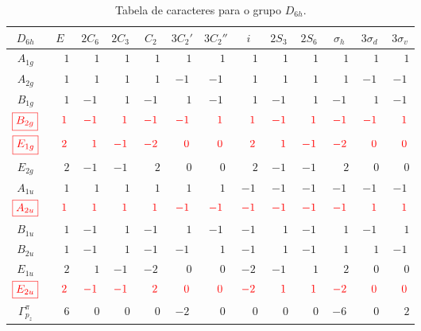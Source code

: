 \documentclass[a4paper,10pt]{article}
\renewcommand{\p}{\phantom{+}}
\renewcommand{\c}[1]{\textcolor{red}{#1}}
\begin{document}
\begin{table}[H]
\caption{Tabela de caracteres para o grupo $D_{6h}$.}
\centering

\begin{tabular} { |c|c c c c c c c c c c c c | }
\hline
$D_{6h}$ & $E$ & $2 C_6$ & $2 C_3$ & $C_2$ & $3 C_2'$ & $3 C_2''$ & $i$ & $2 S_3$ & $2 S_6$ & $\sigma_h$ & $3 \sigma_d$ & $3 \sigma_v$ \\
\hline
$A_{1g}$ & $\p1$ & $\p1$ & $\p1$ & $\p1$ & $\p1$ & $\p1$ & $\p1$ & $\p1$ & $\p1$ & $\p1$ & $\p1$ & $\p1$ \\
$A_{2g}$ & $\p1$ & $\p1$ & $\p1$ & $\p1$ & $ -1$ & $ -1$ & $\p1$ & $\p1$ & $\p1$ & $\p1$ & $ -1$ & $ -1$ \\
$B_{1g}$ & $\p1$ & $ -1$ & $\p1$ & $ -1$ & $\p1$ & $ -1$ & $\p1$ & $ -1$ & $\p1$ & $ -1$ & $\p1$ & $ -1$ \\
$\c{\boxed{B_{2g}}}$ & $\c{\p1}$ & $\c{ -1}$ & $\c{\p1}$ & $\c{ -1}$ & $\c{ -1}$ & $\c{\p1}$ & $\c{\p1}$ & $\c{ -1}$ & $\c{\p1}$ & $\c{ -1}$ & $\c{ -1}$ & $\c{\p1}$ \\
$\c{\boxed{E_{1g}}}$ & $\c{\p2}$ & $\c{\p1}$ & $\c{ -1}$ & $\c{ -2}$ & $\c{\p0}$ & $\c{\p0}$ & $\c{\p2}$ & $\c{\p1}$ & $\c{ -1}$ & $\c{ -2}$ & $\c{\p0}$ & $\c{\p0}$ \\
$E_{2g}$ & $\p2$ & $ -1$ & $ -1$ & $\p2$ & $\p0$ & $\p0$ & $\p2$ & $ -1$ & $ -1$ & $\p2$ & $\p0$ & $\p0$ \\
$A_{1u}$ & $\p1$ & $\p1$ & $\p1$ & $\p1$ & $\p1$ & $\p1$ & $ -1$ & $ -1$ & $ -1$ & $ -1$ & $ -1$ & $ -1$ \\
$\c{\boxed{A_{2u}}}$ & $\c{\p1}$ & $\c{\p1}$ & $\c{\p1}$ & $\c{\p1}$ & $\c{ -1}$ & $\c{ -1}$ & $\c{ -1}$ & $\c{ -1}$ & $\c{ -1}$ & $\c{ -1}$ & $\c{\p1}$ & $\c{\p1}$ \\
$B_{1u}$ & $\p1$ & $ -1$ & $\p1$ & $ -1$ & $\p1$ & $ -1$ & $ -1$ & $\p1$ & $ -1$ & $\p1$ & $ -1$ & $\p1$ \\
$B_{2u}$ & $\p1$ & $ -1$ & $\p1$ & $ -1$ & $ -1$ & $\p1$ & $ -1$ & $\p1$ & $ -1$ & $\p1$ & $\p1$ & $ -1$ \\
$E_{1u}$ & $\p2$ & $\p1$ & $ -1$ & $ -2$ & $\p0$ & $\p0$ & $ -2$ & $ -1$ & $\p1$ & $\p2$ & $\p0$ & $\p0$ \\
$\c{\boxed{E_{2u}}}$ & $\c{\p2}$ & $\c{ -1}$ & $\c{ -1}$ & $\c{\p2}$ & $\c{\p0}$ & $\c{\p0}$ & $\c{ -2}$ & $\c{\p1}$ & $\c{\p1}$ & $\c{ -2}$ & $\c{\p0}$ & $\c{\p0}$ \\
\hline
\hline
$\Gamma_{p_z}^\pi$ & $\p6$ & $\p0$ & $\p0$ & $\p0$ & $ -2$ & $\p0$ & $\p0$ & $\p0$ & $\p0$ & $ -6$ & $\p0$ & $\p2$ \\
\hline
\end{tabular}

\label{tab:mult_D3h}
\end{table}
\end{document}
